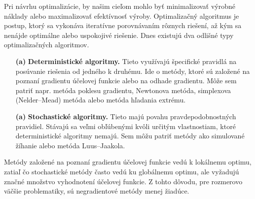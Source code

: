 Pri návrhu optimalizácie, by našim cieľom mohlo byť minimalizovať výrobné náklady alebo maximalizovať efektívnosť výroby. Optimalizačný algoritmus je postup, ktorý sa vykonáva iteratívne porovnávaním rôznych riešení, až kým sa nenájde optimálne alebo uspokojivé riešenie. Dnes existujú dva odlišné typy optimalizačných algoritmov.

\begin{itemize}
	\item[\textbf{(a)}] \textbf{Deterministické algoritmy.} 
	Tieto využívajú špecifické pravidlá na posúvanie riešenia od jedného k druhému. Ide o metódy, ktoré sú založené na poznaní gradientu účelovej funkcie alebo na odhade gradientu. Môže sem patriť napr. metóda poklesu gradientu, Newtonova metóda, simplexova (Nelder--Mead) metóda alebo metóda hľadania extrému.
	\item[\textbf{(a)}] \textbf{Stochastické algoritmy.} 
	Tieto majú povahu pravdepodobnostných pravidiel. Stávajú sa veľmi obľúbenými kvôli určitým vlastnostiam, ktoré deterministické algoritmy nemajú. Sem môžu patriť metódy ako simulované žíhanie alebo metóda Luus--Jaakola.
\end{itemize}

Metódy založené na poznaní gradientu účelovej funkcie vedú k lokálnemu optimu, zatiaľ čo stochastické metódy často vedú ku globálnemu optimu, ale vyžadujú značné množstvo vyhodnotení účelovej funkcie. Z tohto dôvodu, pre rozmerovo väčšie problematiky, sú negradientové metódy menej žiadúce.
